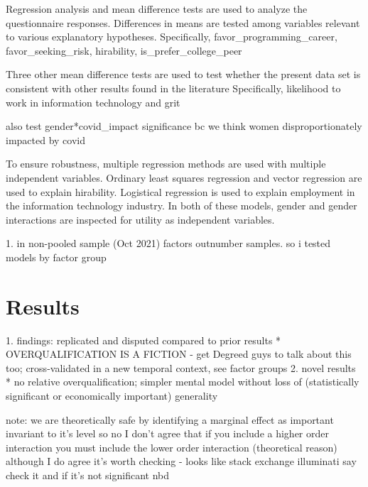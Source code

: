 \documentclass[review]{elsarticle}
\begin{document}
Regression analysis and mean difference tests are used to analyze the questionnaire responses.
Differences in means are tested among variables relevant to various explanatory hypotheses.
Specifically, favor_programming_career, favor_seeking_risk, hirability, is_prefer_college_peer

Three other mean difference tests are used to test whether the present data set is consistent with other results found in the literature
Specifically, likelihood to work in information technology and grit

also test gender*covid_impact significance bc we think women disproportionately impacted by covid

To ensure robustness, multiple regression methods are used with multiple independent variables.
Ordinary least squares regression and vector regression are used to explain hirability.
Logistical regression is used to explain employment in the information technology industry.
In both of these models, gender and gender interactions are inspected for utility as independent variables.



1. in non-pooled sample (Oct 2021) factors outnumber samples. so i tested models by factor group

\section{Results}

1. findings: replicated and disputed compared to prior results
    * OVERQUALIFICATION IS A FICTION - get Degreed guys to talk about this too; cross-validated in a new temporal context, see factor groups
2. novel results
    * no relative overqualification; simpler mental model without loss of (statistically significant or economically important) generality

note: we are theoretically safe by identifying a marginal effect as important invariant to it's level
    so no I don't agree that if you include a higher order interaction you must include the lower order interaction (theoretical reason)
    although I do agree it's worth checking - looks like stack exchange illuminati say check it and if it's not significant nbd
\end{document}
